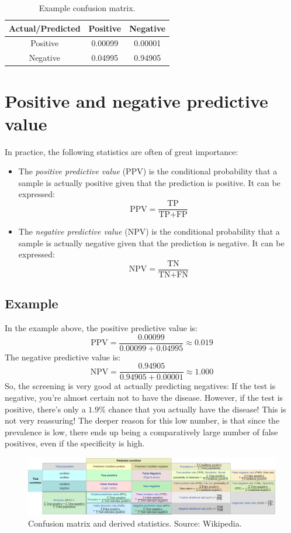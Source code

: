 \documentclass[12pt,a4paper]{article}
\numberwithin{equation}{section}
\begin{document}
\begin{table}
\centering
\label{table:example_confusion_matrix}
\begin{tabular}{c|c|c|}
\cline{2-3}
\multicolumn{1}{l|}{Actual/Predicted} & Positive & Negative \\ \hline
\multicolumn{1}{|c|}{Positive}        & 0.00099  & 0.00001  \\ \hline
\multicolumn{1}{|c|}{Negative}        & 0.04995  & 0.94905  \\ \hline
\end{tabular}
\caption{Example confusion matrix.}
\end{table}

\section{Positive and negative predictive value}
In practice, the following statistics are often of great importance:
\begin{itemize}
\item The \textit{positive predictive value} (PPV) is the conditional probability that a sample is actually positive given that the prediction is positive. It can be expressed:
\begin{equation}
\textrm{PPV}=\frac{\textrm{TP}}{\textrm{TP}+\textrm{FP}}
\end{equation}
\item The \textit{negative predictive value} (NPV) is the conditional probability that a sample is actually negative given that the prediction is negative. It can be expressed:
\begin{equation}
\textrm{NPV}=\frac{\textrm{TN}}{\textrm{TN}+\textrm{FN}}
\end{equation}
\end{itemize}

\subsection{Example}
In the example above, the positive predictive value is:
\begin{equation}
\textrm{PPV}=\frac{0.00099}{0.00099+0.04995}\approx 0.019
\end{equation}
The negative predictive value is:
\begin{equation}
\textrm{NPV}=\frac{0.94905}{0.94905+0.00001}\approx 1.000
\end{equation}
So, the screening is very good at actually predicting negatives: If the test is negative, you're almost certain not to have the disease. However, if the test is positive, there's only a $1.9\%$ chance that you actually have the disease! This is not very reassuring! The deeper reason for this low number, is that since the prevalence is low, there ends up being a comparatively large number of false positives, even if the specificity is high.

\begin{figure}
\centering
\includegraphics[width=\textwidth]{confusion_matrix_extended}
\caption{Confusion matrix and derived statistics. Source: Wikipedia.}
\label{fig:confusion_matrix_extended}
\end{figure}
\end{document}

